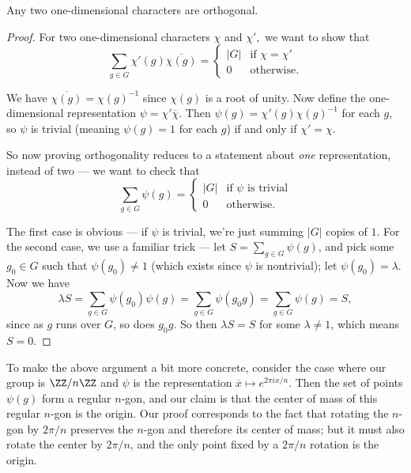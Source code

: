 \begin{proposition}
Any two one-dimensional characters are orthogonal.
\end{proposition}
\begin{proof}
For two one-dimensional characters $\chi$ and $\chi',$ we want to show that \[\sum_{g \in G} \chi'(g)\overline{\chi(g)} = \begin{cases}
|G| &\text{if } \chi = \chi' \\
0 &\text{otherwise}.
\end{cases}\]

We have $\overline{\chi(g)} = \chi(g)^{-1}$ since $\chi(g)$ is a root of unity. Now define the one-dimensional representation $\psi = \chi'\overline{\chi}$. Then $\psi(g) = \chi'(g)\chi(g)^{-1}$ for each $g$, so $\psi$ is trivial (meaning $\psi(g) = 1$ for each $g$) if and only if $\chi' = \chi$. 




So now proving orthogonality reduces to a statement about \emph{one} representation, instead of two --- we want to check that \[\sum_{g \in G} \psi(g) = \begin{cases}
|G| &\text{if $\psi$ is trivial} \\
0 &\text{otherwise}.
\end{cases}\]

The first case is obvious --- if $\psi$ is trivial, we're just summing $|G|$ copies of $1$. For the second case, we use a familiar trick --- let $S = \sum_{g \in G} \psi(g)$, and pick some $g_0 \in G$ such that $\psi(g_0) \neq 1$ (which exists since $\psi$ is nontrivial); let $\psi(g_0) = \lambda$. Now we have \[\lambda S = \sum_{g \in G} \psi(g_0)\psi(g) = \sum_{g \in G} \psi(g_0g) = \sum_{g \in G} \psi(g) = S,\] since as $g$ runs over $G$, so does $g_0g$. So then $\lambda S = S$ for some $\lambda \neq 1$, which means $S = 0$. 
\end{proof}

\begin{example}
To make the above argument a bit more concrete, consider the case where our group is $\ZZ/n\ZZ$ and $\psi$ is the representation $\overline{x} \mapsto e^{2\pi ix/n}$. Then the set of points $\psi(g)$ form a regular $n$-gon, and our claim is that the center of mass of this regular $n$-gon is the origin. Our proof corresponds to the fact that rotating the $n$-gon by $2\pi/n$ preserves the $n$-gon and therefore its center of mass; but it must also rotate the center by $2\pi/n$, and the only point fixed by a $2\pi/n$ rotation is the origin. 
\end{example}

